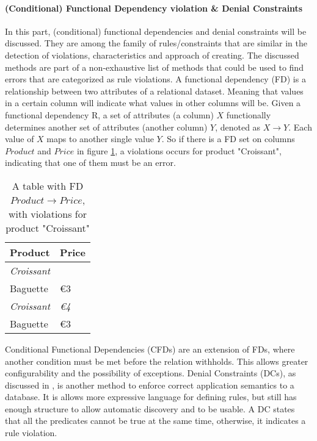\paragraph{(Conditional) Functional Dependency violation \& Denial Constraints}
In this part, (conditional) functional dependencies and denial constraints will be discussed. They are among the family of rules/constraints that are similar in the detection of violations, characteristics and approach of creating. The discussed methods are part of a non-exhaustive list of methods that could be used to find errors that are categorized as rule violations. 
A functional dependency (FD) is a relationship between two attributes of a relational dataset. Meaning that values in a certain column will indicate what values in other columns will be. Given a functional dependency R, a set of attributes (a column) $X$ functionally determines another set of attributes (another column) $Y$, denoted as $X \rightarrow Y$. Each value of $X$ maps to another single value $Y$. So if there is a FD set on columns $Product$ and $Price$ in figure \ref{tab:functionaldependencyviol}, a violations occurs for product "Croissant", indicating that one of them must be an error.

\begin{table}[]
\centering
\begin{tabular}{ll}
\textbf{Product}   & \textbf{Price} \\ \hline
\textit{Croissant} & \textit{\texteuro 2}    \\
Baguette           & €3             \\
\textit{Croissant} & \textit{€4}    \\
Baguette           & €3            
\end{tabular}
\caption{A table with FD $Product \rightarrow Price$, with violations for product "Croissant"}
\label{tab:functionaldependencyviol}
\end{table}

Conditional Functional Dependencies (CFDs) are an extension of FDs, where another condition must be met before the relation withholds. This allows greater configurability and the possibility of exceptions. Denial Constraints (DCs), as discussed in \cite{Chu2013-qe}, is another method to enforce correct application semantics to a database. It is allows more expressive language for defining rules, but still has enough structure to allow automatic discovery and to be usable. A DC states that all the predicates cannot be true at the same time, otherwise, it indicates a rule violation.

